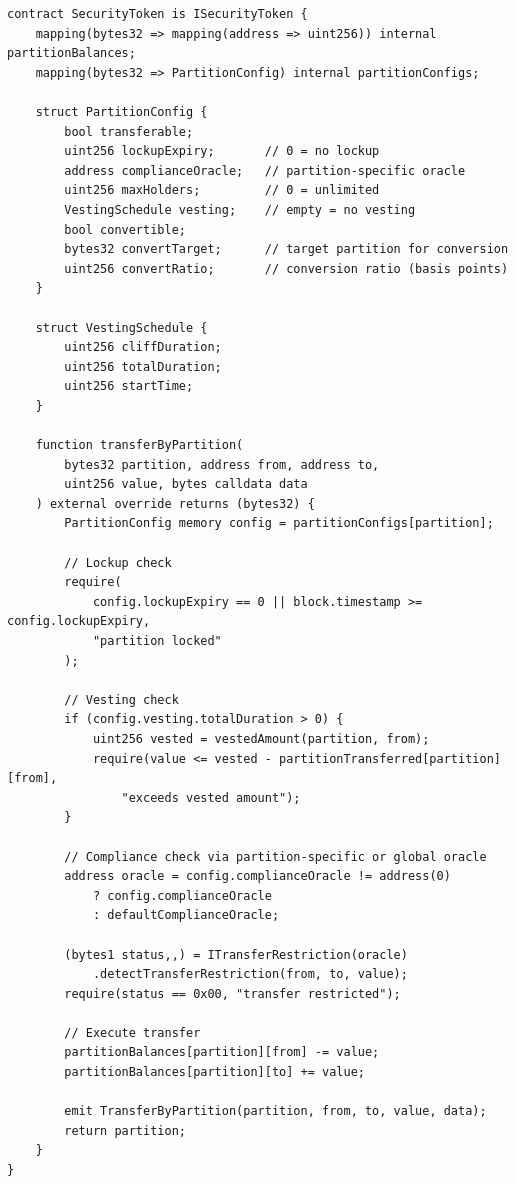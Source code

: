 \begin{lstlisting}[language=Solidity,caption={Partition management operations.}]
contract SecurityToken is ISecurityToken {
    mapping(bytes32 => mapping(address => uint256)) internal partitionBalances;
    mapping(bytes32 => PartitionConfig) internal partitionConfigs;

    struct PartitionConfig {
        bool transferable;
        uint256 lockupExpiry;       // 0 = no lockup
        address complianceOracle;   // partition-specific oracle
        uint256 maxHolders;         // 0 = unlimited
        VestingSchedule vesting;    // empty = no vesting
        bool convertible;
        bytes32 convertTarget;      // target partition for conversion
        uint256 convertRatio;       // conversion ratio (basis points)
    }

    struct VestingSchedule {
        uint256 cliffDuration;
        uint256 totalDuration;
        uint256 startTime;
    }

    function transferByPartition(
        bytes32 partition, address from, address to,
        uint256 value, bytes calldata data
    ) external override returns (bytes32) {
        PartitionConfig memory config = partitionConfigs[partition];

        // Lockup check
        require(
            config.lockupExpiry == 0 || block.timestamp >= config.lockupExpiry,
            "partition locked"
        );

        // Vesting check
        if (config.vesting.totalDuration > 0) {
            uint256 vested = vestedAmount(partition, from);
            require(value <= vested - partitionTransferred[partition][from],
                "exceeds vested amount");
        }

        // Compliance check via partition-specific or global oracle
        address oracle = config.complianceOracle != address(0)
            ? config.complianceOracle
            : defaultComplianceOracle;

        (bytes1 status,,) = ITransferRestriction(oracle)
            .detectTransferRestriction(from, to, value);
        require(status == 0x00, "transfer restricted");

        // Execute transfer
        partitionBalances[partition][from] -= value;
        partitionBalances[partition][to] += value;

        emit TransferByPartition(partition, from, to, value, data);
        return partition;
    }
}
\end{lstlisting}


